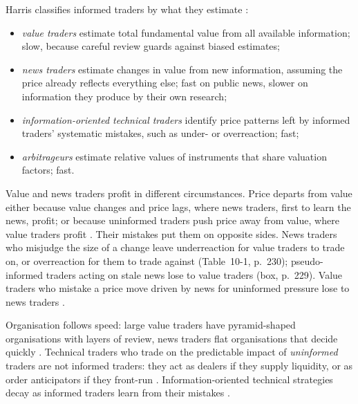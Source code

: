 \begin{qfdefinition}\label{def:informed-trader-types}
 Harris classifies informed traders by what they estimate \citep[chap.~``Informed Traders and Market Efficiency'', sec.~10.5, pp.~226--235, Table~10-3, p.~235]{alpha-harris}:
\begin{itemize}
\item \emph{value traders} estimate total fundamental value from all available information; slow, because careful review guards against biased estimates;
\item \emph{news traders} estimate changes in value from new information, assuming the price already reflects everything else; fast on public news, slower on information they produce by their own research;
\item \emph{information-oriented technical traders} identify price patterns left by informed traders' systematic mistakes, such as under- or overreaction; fast;
\item \emph{arbitrageurs} estimate relative values of instruments that share valuation factors; fast.
\end{itemize}

 Value and news traders profit in different circumstances. Price departs from value either because value changes and price lags, where news traders, first to learn the news, profit; or because uninformed traders push price away from value, where value traders profit \citep[chap.~``Value Traders'', sec.~16.1, pp.~338--339]{alpha-harris}. Their mistakes put them on opposite sides. News traders who misjudge the size of a change leave underreaction for value traders to trade on, or overreaction for them to trade against (Table~10-1, p.~230); pseudo-informed traders acting on stale news lose to value traders (box, p.~229). Value traders who mistake a price move driven by news for uninformed pressure lose to news traders \citep[chap.~``Informed Traders and Market Efficiency'', p.~239]{alpha-harris}.

 Organisation follows speed: large value traders have pyramid-shaped organisations with layers of review, news traders flat organisations that decide quickly \citep[same chap., pp.~227--229]{alpha-harris}. Technical traders who trade on the predictable impact of \emph{uninformed} traders are not informed traders: they act as dealers if they supply liquidity, or as order anticipators if they front-run \citep[same chap., p.~231]{alpha-harris}. Information-oriented technical strategies decay as informed traders learn from their mistakes \citep[same chap., p.~231]{alpha-harris}.


\end{qfdefinition}
